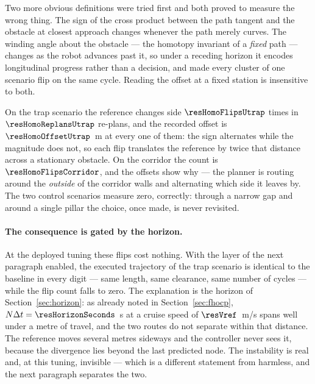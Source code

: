 Two more obvious definitions were tried first and both proved to measure the wrong thing. The sign of the
cross product between the path tangent and the obstacle at closest approach changes whenever the path merely
curves. The winding angle about the obstacle --- the homotopy invariant of a \emph{fixed} path --- changes as
the robot advances past it, so under a receding horizon it encodes longitudinal progress rather than a
decision, and made every cluster of one scenario flip on the same cycle. Reading the offset at a fixed
station is insensitive to both.


On the trap scenario the reference changes side $\resHomoFlipsUtrap$ times in $\resHomoReplansUtrap$
re-plans, and the recorded offset is $\resHomoOffsetUtrap$~m at every one of them: the sign alternates while
the magnitude does not, so each flip translates the reference by twice that distance across a stationary
obstacle. On the corridor the count is $\resHomoFlipsCorridor$, and the offsets show why --- the planner is
routing around the \emph{outside} of the corridor walls and alternating which side it leaves by. The two
control scenarios measure zero, correctly: through a narrow gap and around a single pillar the choice, once
made, is never revisited.

\paragraph{The consequence is gated by the horizon.}
At the deployed tuning these flips cost nothing. With the layer of the next paragraph enabled, the executed
trajectory of the trap scenario is identical to the baseline in every digit --- same length, same clearance,
same number of cycles --- while the flip count falls to zero. The explanation is the horizon of
Section~\ref{sec:horizon}: as already noted in Section~\ref{sec:fhocp}, $N\Delta t=\resHorizonSeconds$~s at a
cruise speed of $\resVref$~m/s spans well under a metre of travel, and the two routes do not separate within
that distance. The reference moves several
metres sideways and the controller never sees it, because the divergence lies beyond the last predicted node.
The instability is real and, at this tuning, invisible --- which is a different statement from harmless, and
the next paragraph separates the two.

